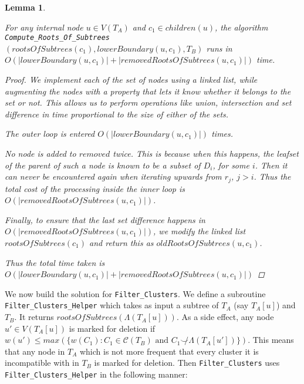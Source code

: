 \documentclass{article}
\newcommand{\compatible}{\smile}
\newcommand{\leafset}{\Lambda}
\newtheorem{computerootsofsubtreesruntime}[incompatibility]{Lemma}
\begin{document}
    \begin{computerootsofsubtreesruntime}
        \label{lem:computerootsofsubtreesruntime}

        For any internal node $u \in V(T_A)$ and $c_1 \in children(u)$, the algorithm \texttt{Compute\_Roots\_Of\_Subtrees}$(rootsOfSubtrees(c_1), lowerBoundary(u, c_1), T_B)$ runs in $O(|lowerBoundary(u, c_1)| + |removedRootsOfSubtrees(u, c_1)|)$ time.

        \begin{proof}
            We implement each of the set of nodes using a linked list, while augmenting the nodes with a property that lets it know whether it belongs to the set or not. This allows us to perform operations like union, intersection and set difference in time proportional to the size of either of the sets.

            The outer loop is entered $O(|lowerBoundary(u, c_1)|)$ times.

            No node is added to $removed$ twice. This is because when this happens, the leafset of the parent of such a node is known to be a subset of $D_i$, for some $i$. Then it can never be encountered again when iterating upwards from $r_j$, $j > i$. Thus the total cost of the processing inside the inner loop is $O(|removedRootsOfSubtrees(u, c_1)|)$.

            Finally, to ensure that the last set difference happens in $O(|removedRootsOfSubtrees(u, c_1)|)$, we modify the linked list $rootsOfSubtrees(c_1)$ and return this as $oldRootsOfSubtrees(u, c_1)$.

            Thus the total time taken is $O(|lowerBoundary(u, c_1)| + |removedRootsOfSubtrees(u, c_1)|)$
        \end{proof}
    \end{computerootsofsubtreesruntime}

    We now build the solution for \texttt{Filter\_Clusters}. We define a subroutine \texttt{Filter\_Clusters\_Helper} which takes as input a subtree of $T_A$ (say $T_A[u]$) and $T_B$. It returns $rootsOfSubtrees(\leafset(T_A[u]))$. As a side effect, any node $u' \in V(T_A[u])$ is marked for deletion if $w(u') \leq max(\{w(C_1) : C_1 \in \mathcal{C}(T_B) \text{ and } C_1 \not\compatible \leafset(T_A[u'])\})$. This means that any node in $T_A$ which is not more frequent that every cluster it is incompatible with in $T_B$ is marked for deletion. Then \texttt{Filter\_Clusters} uses \texttt{Filter\_Clusters\_Helper} in the following manner:
\end{document}
